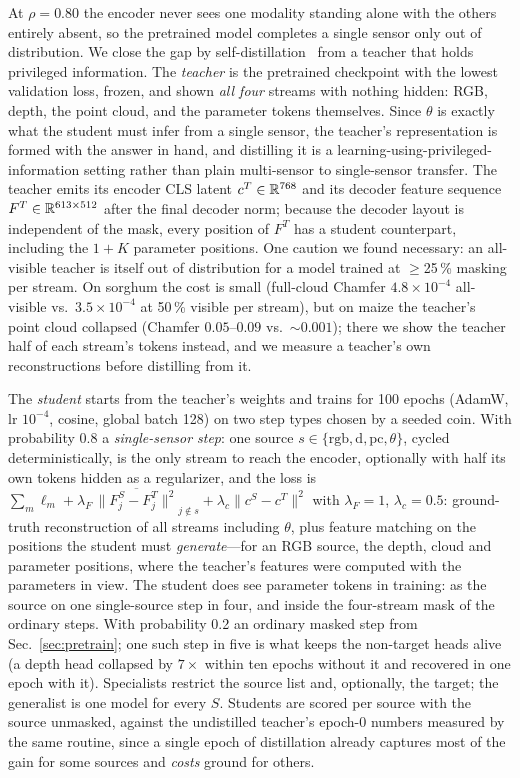 At $\rho{=}0.80$ the encoder never sees one modality standing alone with the
others entirely absent, so the pretrained model completes a single sensor only
out of distribution. We close the gap by self-distillation~\cite{hinton2015distill}
from a teacher that holds privileged information. The \emph{teacher} is the
pretrained checkpoint with the lowest validation loss, frozen, and shown
\emph{all four} streams with nothing hidden: RGB, depth, the point cloud, and
the parameter tokens themselves. Since $\theta$ is exactly what the student
must infer from a single sensor, the teacher's representation is formed with
the answer in hand, and distilling it is a learning-using-privileged-information
setting rather than plain multi-sensor to single-sensor transfer. The teacher
emits its encoder CLS latent $c^T\in\mathbb{R}^{768}$ and its decoder feature sequence
$F^T\in\mathbb{R}^{613\times512}$ after the final decoder norm; because the decoder
layout is independent of the mask, every position of $F^T$ has a student
counterpart, including the $1{+}K$ parameter positions. One caution we found
necessary: an all-visible teacher is itself out of distribution for a model
trained at $\ge$25\,\% masking per stream. On sorghum the cost is small
(full-cloud Chamfer $4.8\times10^{-4}$ all-visible vs.\ $3.5\times10^{-4}$ at
50\,\% visible per stream), but on maize the teacher's point cloud collapsed
(Chamfer $0.05$--$0.09$ vs.\ $\sim$$0.001$); there we show the teacher half of
each stream's tokens instead, and we measure a teacher's own reconstructions
before distilling from it.

The \emph{student} starts from the teacher's weights and trains for 100 epochs
(AdamW, lr $10^{-4}$, cosine, global batch 128) on two step types chosen by a
seeded coin. With probability 0.8 a \emph{single-sensor step}: one source
$s\in\{\mathrm{rgb},\mathrm{d},\mathrm{pc},\theta\}$, cycled deterministically, is the
only stream to reach the encoder, optionally with half its own tokens hidden as
a regularizer, and the loss is
$\sum_m\ell_m+\lambda_F\,\overline{\|F^S_j-F^T_j\|^2}_{j\notin s}+\lambda_c\|c^S-c^T\|^2$
with $\lambda_F{=}1$, $\lambda_c{=}0.5$: ground-truth reconstruction of all
streams including $\theta$, plus feature matching on the positions the student
must \emph{generate}---for an RGB source, the depth, cloud and parameter
positions, where the teacher's features were computed with the parameters in
view. The student does see parameter tokens in training: as the source on one
single-source step in four, and inside the four-stream mask of the ordinary
steps. With probability 0.2 an ordinary masked step from
Sec.~\ref{sec:pretrain}; one such step in five is what keeps the non-target
heads alive (a depth head collapsed by $7\times$ within ten epochs without it
and recovered in one epoch with it). Specialists restrict the source list and,
optionally, the target; the generalist is one model for every $S$. Students
are scored per source with the source unmasked, against the undistilled
teacher's epoch-0 numbers measured by the same routine, since a single epoch
of distillation already captures most of the gain for some sources and
\emph{costs} ground for others.

